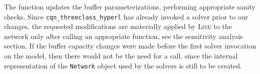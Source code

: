 The  function updates the buffer parameterizations, performing appropriate sanity checks. Since \texttt{cqn\_threeclass\_hyperl} has already invoked a solver prior to our changes, the requested modifications are materially applied by \textsc{Line} to the network only after calling an appropriate  function, see the sensitivity analysis section. If the buffer capacity changes were made before the first solver invocation on the model, then there would not be the need for a  call, since the internal representation of the \texttt{Network} object used by the solvers is still to be created.


